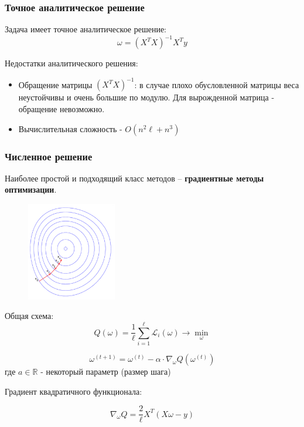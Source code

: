 \documentclass{beamer}
\begin{document}
	\begin{frame}
		\frametitle{Точное аналитическое решение}
		Задача имеет точное аналитическое решение:
		$$
		\omega = (X^{T} X)^{-1} X^{T}y
		$$
		
		\vspace{15pt}
		
		Недостатки аналитического решения:
		\begin{itemize}
			\item Обращение матрицы $(X^{T} X)^{-1}$: в случае плохо обусловленной матрицы веса неустойчивы и очень большие по модулю. Для вырожденной матрица - обращение невозможно.
			\item Вычислительная сложность - $O(n^{2}\ell + n^{3})$
		\end{itemize}
	\end{frame}


	\begin{frame}
		\frametitle{Численное решение}
		Наиболее простой и подходящий класс методов -- \textbf{градиентные методы оптимизации}.
		
		\vspace{5pt}
		
		\begin{figure}
			\centering
			\includegraphics[width=0.35\textwidth]{img/grad.png}
		\end{figure}
		
		Общая схема:
		$$
		Q(\omega) = \frac{1}{\ell} \sum_{i=1}^{\ell} \mathcal{L}_{i}(\omega) \to \min_{\omega}
		$$
		
		$$
		\omega^{(t + 1)} = \omega^{(t)} - \alpha \cdot \nabla_{\omega} Q(\omega^{(t)})
		$$
		где $a \in \mathbb{R}$ - некоторый параметр (размер шага)
		
		\vspace{5pt}

		Градиент квадратичного функционала:
		
		$$
		\nabla_{\omega} Q = \frac{2}{\ell} X^{T}(X\omega - y)
		$$
	\end{frame}
\end{document}
